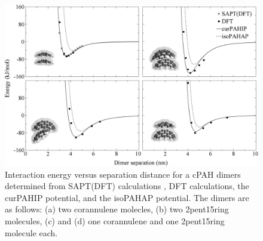 %
\begin{figure}[!tbh]
\centering
\includegraphics[width=1\linewidth]{Figures/potentialDFT_curves.eps}
\caption{Interaction energy versus separation distance for a cPAH dimers determined from SAPT(DFT) calculations \cite{Cabaleiro-Lago2018}, DFT calculations, the curPAHIP potential, and the isoPAHAP potential. The dimers are as follows: (a) two corannulene molecles, (b) two 2pent15ring molecules, (c) and (d) one corannulene and one 2pent15ring molecule each.}
\label{fig:potentialDFTcurves}
\end{figure}
%
